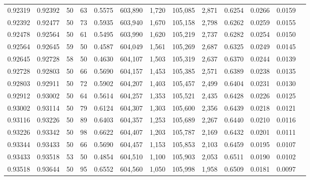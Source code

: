 \begin{tabular}{rrrrrrrrrrrrr}
0.92319 & 0.92392 &    50 &  63 &                                     0.5575 & 603,890 &   1,720 & 105,085 &   2,871 & 0.6254 & 0.0266 & 0.0159 \\
0.92392 & 0.92477 &    50 &  73 &                                     0.5935 & 603,940 &   1,670 & 105,158 &   2,798 & 0.6262 & 0.0259 & 0.0155 \\
0.92478 & 0.92564 &    50 &  61 &                                     0.5495 & 603,990 &   1,620 & 105,219 &   2,737 & 0.6282 & 0.0254 & 0.0150 \\
0.92564 & 0.92645 &    59 &  50 &                                     0.4587 & 604,049 &   1,561 & 105,269 &   2,687 & 0.6325 & 0.0249 & 0.0145 \\
0.92645 & 0.92728 &    58 &  50 &                                     0.4630 & 604,107 &   1,503 & 105,319 &   2,637 & 0.6370 & 0.0244 & 0.0139 \\
0.92728 & 0.92803 &    50 &  66 &                                     0.5690 & 604,157 &   1,453 & 105,385 &   2,571 & 0.6389 & 0.0238 & 0.0135 \\
0.92803 & 0.92911 &    50 &  72 &                                     0.5902 & 604,207 &   1,403 & 105,457 &   2,499 & 0.6404 & 0.0231 & 0.0130 \\
0.92912 & 0.93002 &    50 &  64 &                                     0.5614 & 604,257 &   1,353 & 105,521 &   2,435 & 0.6428 & 0.0226 & 0.0125 \\
0.93002 & 0.93114 &    50 &  79 &                                     0.6124 & 604,307 &   1,303 & 105,600 &   2,356 & 0.6439 & 0.0218 & 0.0121 \\
0.93116 & 0.93226 &    50 &  89 &                                     0.6403 & 604,357 &   1,253 & 105,689 &   2,267 & 0.6440 & 0.0210 & 0.0116 \\
0.93226 & 0.93342 &    50 &  98 &                                     0.6622 & 604,407 &   1,203 & 105,787 &   2,169 & 0.6432 & 0.0201 & 0.0111 \\
0.93344 & 0.93433 &    50 &  66 &                                     0.5690 & 604,457 &   1,153 & 105,853 &   2,103 & 0.6459 & 0.0195 & 0.0107 \\
0.93433 & 0.93518 &    53 &  50 &                                     0.4854 & 604,510 &   1,100 & 105,903 &   2,053 & 0.6511 & 0.0190 & 0.0102 \\
0.93518 & 0.93644 &    50 &  95 &                                     0.6552 & 604,560 &   1,050 & 105,998 &   1,958 & 0.6509 & 0.0181 & 0.0097 \\

\end{tabular}
